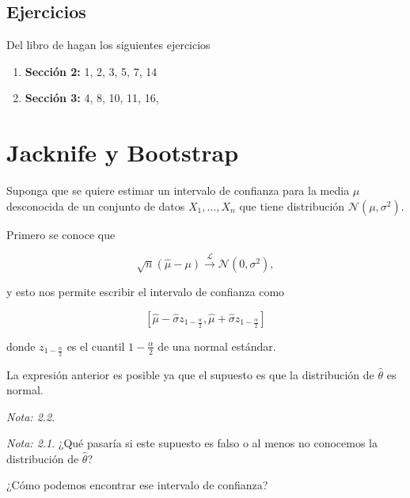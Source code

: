 \documentclass[
  12pt,
]{book}
\providecommand{\tightlist}{%
  \setlength{\itemsep}{0pt}\setlength{\parskip}{0pt}}
\theoremstyle{definition}
\theoremstyle{definition}
\theoremstyle{definition}
\theoremstyle{remark}
\newtheorem*{remark}{Nota: }
\begin{document}
\hypertarget{ejercicios}{%
\section{Ejercicios}\label{ejercicios}}

Del libro de \autocite{Hardle2004} hagan los siguientes ejercicios

\begin{enumerate}
\def\labelenumi{\arabic{enumi}.}
\tightlist
\item
  \textbf{Sección 2:} 1, 2, 3, 5, 7, 14
\item
  \textbf{Sección 3:} 4, 8, 10, 11, 16,
\end{enumerate}

\hypertarget{jacknife-y-bootstrap}{%
\chapter{Jacknife y Bootstrap}\label{jacknife-y-bootstrap}}

Suponga que se quiere estimar un intervalo de confianza para la media
\(\mu\) desconocida de un conjunto de datos \(X_{1},\ldots, X_{n}\)
que tiene distribución \(\mathcal{N}\left(\mu ,\sigma^{2}\right)\).

Primero se conoce que

\begin{equation*}
\sqrt{n}\left( \hat{\mu} - \mu \right)
\xrightarrow{\mathcal{L}} \mathcal{N}\left(0,\sigma^{2}\right),
\end{equation*}

y esto nos permite escribir el intervalo de confianza como

\begin{equation*}
\left[ \hat{\mu} - \hat{\sigma}z_{1-\frac{\alpha}{2}} ,
\hat{\mu} + \hat{\sigma}z_{1-\frac{\alpha}{2}}\right]
\end{equation*}

donde \(z_{1-\frac{\alpha}{2}}\) es el cuantil \(1-\frac{\alpha}{2}\)
de una normal estándar.

La expresión anterior es posible ya que el supuesto es que la
distribución de \(\hat{\theta}\) es normal.

\begin{remark}
\begin{remark}

{}¿Qué pasaría si este supuesto es falso o al menos no conocemos la
distribución de \(\hat{\theta}\)?

¿Cómo podemos encontrar ese intervalo de confianza?

\end{remark}
\end{remark}
\end{document}
